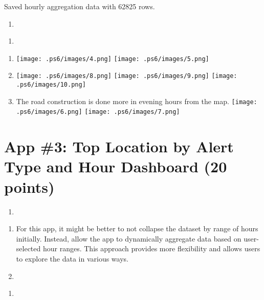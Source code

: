 \documentclass[
  letterpaper,
  DIV=11,
  numbers=noendperiod]{scrartcl}
\providecommand{\tightlist}{%
  \setlength{\itemsep}{0pt}\setlength{\parskip}{0pt}}\usepackage{longtable,booktabs,array}
\begin{document}
Saved hourly aggregation data with 62825 rows.

\begin{enumerate}
\def\labelenumi{\alph{enumi}.}
\setcounter{enumi}{2}
\tightlist
\item
\end{enumerate}

\begin{enumerate}
\def\labelenumi{\arabic{enumi}.}
\setcounter{enumi}{1}
\tightlist
\item
\end{enumerate}

\begin{enumerate}
\def\labelenumi{\alph{enumi}.}
\item
  \texttt{[image: .ps6/images/4.png]}
  \texttt{[image: .ps6/images/5.png]}
\item
  \texttt{[image: .ps6/images/8.png]}
  \texttt{[image: .ps6/images/9.png]}
  \texttt{[image: .ps6/images/10.png]}
\item
  The road construction is done more in evening hours from the map.
  \texttt{[image: .ps6/images/6.png]}
  \texttt{[image: .ps6/images/7.png]}
\end{enumerate}

\section*{App \#3: Top Location by Alert Type and Hour Dashboard (20
points)}\label{app-3-top-location-by-alert-type-and-hour-dashboard-20-points}

\begin{enumerate}
\def\labelenumi{\arabic{enumi}.}
\tightlist
\item
\end{enumerate}

\begin{enumerate}
\def\labelenumi{\alph{enumi}.}
\item
  For this app, it might be better to not collapse the dataset by range
  of hours initially. Instead, allow the app to dynamically aggregate
  data based on user-selected hour ranges. This approach provides more
  flexibility and allows users to explore the data in various ways.
\item
\end{enumerate}

\begin{enumerate}
\def\labelenumi{\arabic{enumi}.}
\setcounter{enumi}{1}
\tightlist
\item
\end{enumerate}
\end{document}
